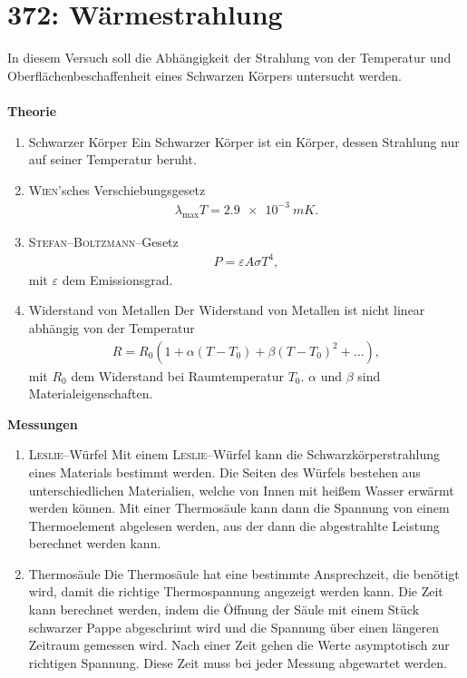 \section{372: Wärmestrahlung}
In diesem Versuch soll die Abhängigkeit der Strahlung von der Temperatur und Oberflächenbeschaffenheit eines Schwarzen Körpers untersucht werden.\\\\
\textbf{Theorie} 
\begin{enumerate}[label=--]
        \item Schwarzer Körper \hspace{25pt}
                Ein Schwarzer Körper ist ein Körper, dessen Strahlung nur auf seiner Temperatur beruht.
        \item \textsc{Wien}'sches Verschiebungsgesetz \hspace{25pt}
                \begin{align} 
                        \lambda _\text{max}T=\SI{2,9e-3}{mK}
                .\end{align} 
        \item \textsc{Stefan--Boltzmann}--Gesetz
                \begin{align} 
                        P=\varepsilon A\sigma T^4
                ,\end{align} 
                mit $\varepsilon $ dem Emissionsgrad.
        \item Widerstand von Metallen \hspace{25pt}
                Der Widerstand von Metallen ist nicht linear abhängig von der Temperatur
                \begin{align} 
                        R=R_0\left(1+\alpha \left(T-T_0\right)+\beta \left(T-T_0\right)^2+\hdots \right)
                ,\end{align} 
                mit $R_0$ dem Widerstand bei Raumtemperatur $T_0$. $\alpha $ und $\beta $ sind Materialeigenschaften.
\end{enumerate}
\textbf{Messungen} 
\begin{enumerate}[label=--]
        \item \textsc{Leslie}--Würfel \hspace{25pt}
                Mit einem \textsc{Leslie}--Würfel kann die Schwarzkörperstrahlung eines Materials bestimmt werden.
                Die Seiten des Würfels bestehen aus unterschiedlichen Materialien, welche von Innen mit heißem Wasser erwärmt werden können. 
                Mit einer Thermosäule kann dann die Spannung von einem Thermoelement abgelesen werden, aus der dann die abgestrahlte Leistung berechnet werden kann.
        \item Thermosäule \hspace{25pt}
                Die Thermosäule hat eine bestimmte Ansprechzeit, die benötigt wird, damit die richtige Thermospannung angezeigt werden kann.
                Die Zeit kann berechnet werden, indem die Öffnung der Säule mit einem Stück schwarzer Pappe abgeschrimt wird und die Spannung über einen längeren Zeitraum gemessen wird.
                Nach einer Zeit gehen die Werte asymptotisch zur richtigen Spannung.
                Diese Zeit muss bei jeder Messung abgewartet werden.
\end{enumerate}
